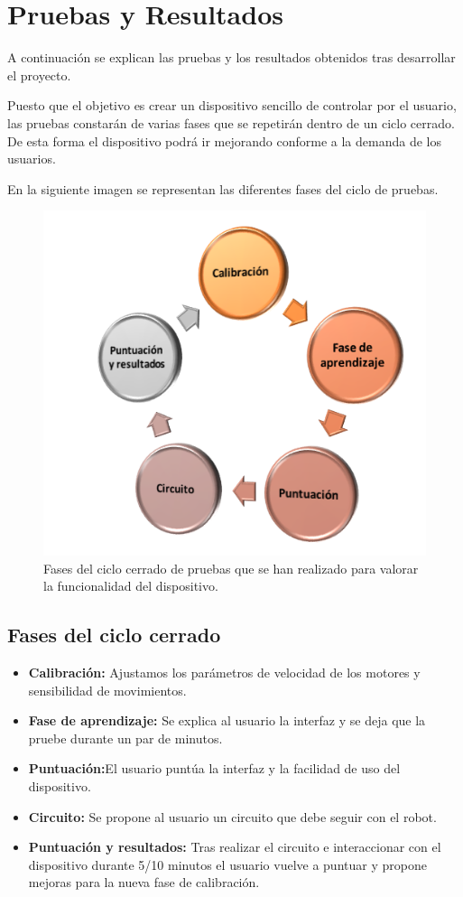 \documentclass[twoside, 11pt]{epstfg}
\begin{document}
\chapter{Pruebas y Resultados}

A continuación se explican las pruebas y los resultados obtenidos tras desarrollar el proyecto.

Puesto que el objetivo es crear un dispositivo sencillo de controlar por el usuario, las pruebas constarán de varias fases que se repetirán dentro de un ciclo cerrado. De esta forma el dispositivo podrá ir mejorando conforme a la demanda de los usuarios.

En la siguiente imagen se representan las diferentes fases del ciclo de pruebas.

\begin{figure}[h!]
	\centerline{
		\mbox{\includegraphics[width=.60\textwidth]{images/CicloPruebas.png}}
	}
	\caption{Fases del ciclo cerrado de pruebas que se han realizado para valorar la funcionalidad del dispositivo.}
\end{figure}

\section{Fases del ciclo cerrado}
\begin{itemize}
	\item \textbf{Calibración:} Ajustamos los parámetros de velocidad de los motores y sensibilidad de movimientos.
	\item \textbf{Fase de aprendizaje:} Se explica al usuario la interfaz y se deja que la pruebe durante un par de minutos.
	\item \textbf{Puntuación:}El usuario puntúa la interfaz y la facilidad de uso del dispositivo.
	\item \textbf{Circuito:} Se propone al usuario un circuito que debe seguir con el robot.
	\item \textbf{Puntuación y resultados:} Tras realizar el circuito e interaccionar con el dispositivo durante 5/10 minutos el usuario vuelve a puntuar y propone mejoras para la nueva fase de calibración.
\end{itemize}
\end{document}

